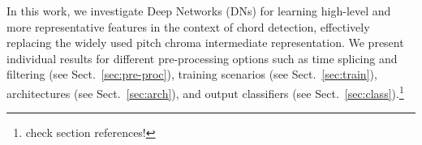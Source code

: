 \documentclass{article}
\begin{document}
In this work, we investigate Deep Networks (DNs) for learning high-level and more representative features in the context of chord detection, effectively replacing the widely used pitch chroma intermediate representation. 
We present individual results for different pre-processing options such as time splicing and filtering (see Sect.~\ref{sec:pre-proc}), training scenarios (see Sect.~\ref{sec:train}), architectures (see Sect.~\ref{sec:arch}), and output classifiers (see Sect.~\ref{sec:class}).\footnote{check section references!} %

%

\end{document}
